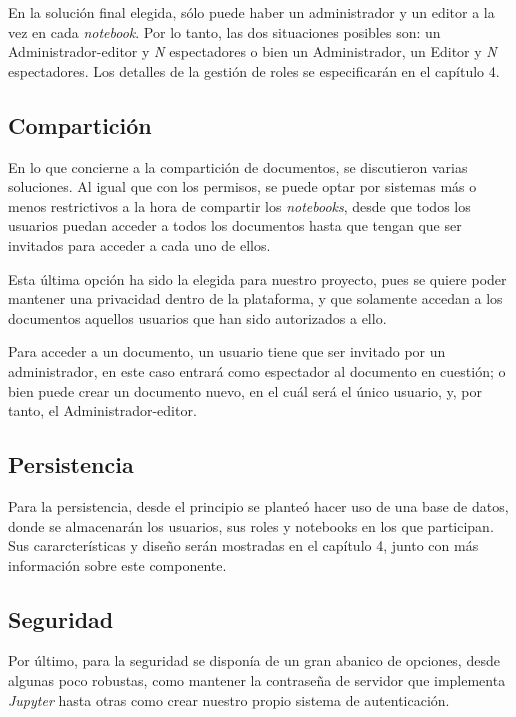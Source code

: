 \documentclass[11pt,spanish,listoffigures,listoftables]{tfgetsinf}
\begin{document}
En la solución final elegida, sólo puede haber un administrador y un editor a la vez en cada \textit{notebook}. Por lo tanto, las dos situaciones posibles son: un Administrador-editor y \textit{N} espectadores o bien un Administrador, un Editor y \textit{N} espectadores. Los detalles de la gestión de roles se especificarán en el capítulo 4.


\subsection{Compartición}
\label{subsec:comparticion}

En lo que concierne a la compartición de documentos, se discutieron varias soluciones. Al igual que con los permisos, se puede optar por sistemas más o menos restrictivos a la hora de compartir los \textit{notebooks}, desde que todos los usuarios puedan acceder a todos los documentos hasta que tengan que ser invitados para acceder a cada uno de ellos.

Esta última opción ha sido la elegida para nuestro proyecto, pues se quiere poder mantener una privacidad dentro de la plataforma, y que solamente accedan a los documentos aquellos usuarios que han sido autorizados a ello.

Para acceder a un documento, un usuario tiene que ser invitado por un administrador, en este caso entrará como espectador al documento en cuestión; o bien puede crear un documento nuevo, en el cuál será el único usuario, y, por tanto, el Administrador-editor.


\subsection{Persistencia}
\label{subsec:persistencia}

Para la persistencia, desde el principio se planteó hacer uso de una base de datos, donde se almacenarán los usuarios, sus roles y notebooks en los que participan. Sus cararcterísticas y diseño serán mostradas en el capítulo 4, junto con más información sobre este componente.


\subsection{Seguridad}
\label{subsec:seguridad}

Por último, para la seguridad se disponía de un gran abanico de opciones, desde algunas poco robustas, como mantener la contraseña de servidor que implementa \textit{Jupyter} hasta otras como crear nuestro propio sistema de autenticación.
\end{document}
